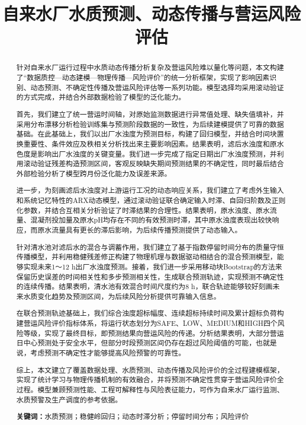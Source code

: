 \documentclass[UTF8,12pt,a4paper]{ctexart}
\title{自来水厂水质预测、动态传播与营运风险评估}
\author{}
\date{}
\newcommand{\keywords}[1]{\par\noindent\textbf{关键词：}#1}
\begin{document}
\maketitle

\begin{abstract}
针对自来水厂运行过程中水质动态传播分析复杂及营运风险难以量化等问题，本文构建了“数据质控—动态建模—物理传播—风险评价”的统一分析框架，实现了影响因素识别、动态预测、不确定性传播及营运风险评估等一系列功能。模型选择均采用滚动验证的方式完成，并结合外部数据检验了模型的泛化能力。

首先，我们建立了统一营运时间轴，对原始监测数据进行异常值处理、缺失值填补，并采用分布漂移分析检验训练集与预测阶段数据的一致性，为后续建模提供了可靠的数据基础。在此基础上，我们以出厂水浊度为预测目标，构建了回归模型，并结合时间块置换重要性、条件效应及秩相关分析找出来主要影响因素。结果表明，滤后水浊度和原水色度是影响出厂水浊度的关键变量。我们进一步完成了指定日期出厂水浊度预测，并利用滚动验证残差构造预测区间，客观反映缺失期间预测结果的不确定性，同时最后结合外部检验分析了模型跨月份泛化能力及误差来源。

进一步，为刻画滤后水浊度对上游运行工况的动态响应关系，我们建立了考虑外生输入和系统记忆特性的ARX动态模型，通过滚动验证联合确定输入时滞、自回归阶数及正则化参数，并结合互相关分析验证了时滞结果的合理性。结果表明，原水浊度、原水流量、混凝剂投加量及原水pH均存在不同的有效预测时滞，其中原水浊度表现出较快响应，而原水流量具有更长的滞后影响，为后续传播预测提供了动态输入。

针对清水池对滤后水的混合与调蓄作用，我们建立了基于指数停留时间分布的质量守恒传播模型，并利用稳健残差修正构建了物理机理与数据驱动相结合的混合预测模型，能够实现未来1～12 h出厂水浊度预测。接着，我们进一步采用移动块Bootstrap的方法来保留历史误差的时间相关性和多步预测相关性，生成联合预测轨迹，实现预测不确定性的连续传播。结果表明，清水池有效混合时间尺度约为8 h，联合轨迹能够较好刻画未来水质变化趋势及预测区间，为后续风险分析提供可靠输入信息。

在联合预测轨迹基础上，我们综合浊度超标幅度、连续超标持续时间及累计超标负荷构建营运风险评价指标体系，将运行状态划分为SAFE、LOW、MEDIUM和HIGH四个风险等级，实现了最终目标，即预测结果向营运风险的传递。分析结果表明，大部分营运日中心预测处于安全水平，但部分时段预测区间仍存在超过风险阈值的可能，也就是说，考虑预测不确定性才能够提高风险预警的可靠性。

综上，本文建立了覆盖数据处理、水质预测、动态传播及风险评价的全过程建模框架，实现了统计学习与物理传播机制的有效融合，并将预测不确定性贯穿于营运风险评价全过程。模型兼顾预测性能、工程可解释性与风险表征能力，可作为自来水厂运行监测、水质预警及生产调度的参考依据。

\keywords{水质预测；稳健岭回归；动态时滞分析；停留时间分布；风险评价}
\end{abstract}
\clearpage
\end{document}
